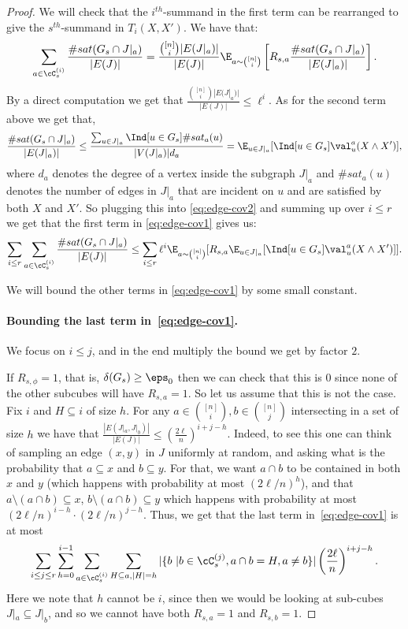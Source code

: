 \begin{proof}
We will check that the $i^{th}$-summand in the first term can be rearranged to give the $s^{th}$-summand in $T_i(X,X')$. We have that:
\begin{equation}\label{eq:edge-cov2}
\sum_{a \in \cC^{(i)}_s} \frac{\#sat(G_s \cap J|_a)}{|E(J)|} = \frac{{[n] \choose i}|E(J|_a)|}{|E(J)|}\E_{a \sim {[n] \choose i}}\left[R_{s,a}\frac{\#sat(G_s \cap J|_a)}{|E(J|_a)|}\right].
\end{equation}
By a direct computation we get that $\frac{{[n] \choose i}|E(J|_a)|}{|E(J)|} \leq \ell^i$. As for the second term above we get that, 
\begin{equation*}
\frac{\#sat(G_s \cap J|_a)}{|E(J|_a)|} \leq \frac{\sum_{u \in J|_a}\Ind[u \in G_s]\#sat_a(u)}{|V(J|_a)|d_a} = \E_{u \in J|_a}[\Ind[u \in G_s]\val_u^a(X \wedge X')],
\end{equation*}
where $d_a$ denotes the degree of a vertex inside the subgraph $J|_a$ and $\#sat_a(u)$ denotes the number of edges in $J|_a$ that are incident on $u$ and are satisfied by both $X$ and $X'$. So plugging this into \eqref{eq:edge-cov2} and summing up over $i \leq r$ we get that the first term in \eqref{eq:edge-cov1} gives us:
\begin{equation}\label{eq:first-term-ec}
\sum_{i \leq r} \sum_{a \in \cC^{(i)}_s} \frac{\#sat(G_s \cap J|_a)}{|E(J)|} \leq \sum_{i \leq r} \ell^i \E_{a \sim {[n] \choose i}}[R_{s,a}\E_{u \in J|_a}[\Ind[u \in G_s]\val_u^a(X \wedge X')]]. 
\end{equation}


We will bound the other terms in \eqref{eq:edge-cov1} by some small constant. 

\paragraph{Bounding the last term in~\eqref{eq:edge-cov1}.} 
We focus on $i\leq j$, and in the end multiply the 
bound we get by factor $2$. 

If $R_{s,\phi} = 1$, that is, $\delta(G_s) \geq \eps_0$ then we can check that this is $0$ since none of the other subcubes will have $R_{s,a} = 1$. So let us assume that this is not the case. 
Fix $i$ and $H\subseteq i$ of size $h$. For any $a \in {[n] \choose i}, b \in {[n] \choose j}$
intersecting in a set of size $h$ we have that
$\frac{|E(J|_a, J|_b)|}{|E(J)|} \leq \left(\frac{2\ell}{n}\right)^{i+j-h}$.
Indeed, to see this one can think of sampling an edge 
$(x,y)$ in $J$ uniformly at random, and asking what 
is the probability that $a\subseteq x$ and $b\subseteq y$. For that, we want $a\cap b$ to be contained in 
both $x$ and $y$ (which happens with probability at most $(2\ell/n)^h$), and that $a\setminus(a\cap b)\subseteq x$, $b\setminus(a\cap b)\subseteq y$
which happens with probability at most $(2\ell/n)^{i-h}\cdot (2\ell/n)^{j-h}$. 
Thus, 
we get that the last term in~\eqref{eq:edge-cov1}
is at most
\[
\sum_{i\leq j \leq r} 
\sum\limits_{h=0}^{i-1}
\sum_{a \in \cC^{(i)}_s}
\sum_{H\subseteq a, |H| = h}
|\{b~|b\in \cC^{(j)}_s, a\cap b = H, a\neq b\}|\left(\frac{2\ell}{n}\right)^{i+j-h}.
\]
Here we note that $h$ cannot be $i$, since then we 
would be looking at sub-cubes $J|_a\subseteq J|_b$, 
and so we cannot have both $R_{s,a} = 1$ and $R_{s,b}=1$.


\end{proof}

